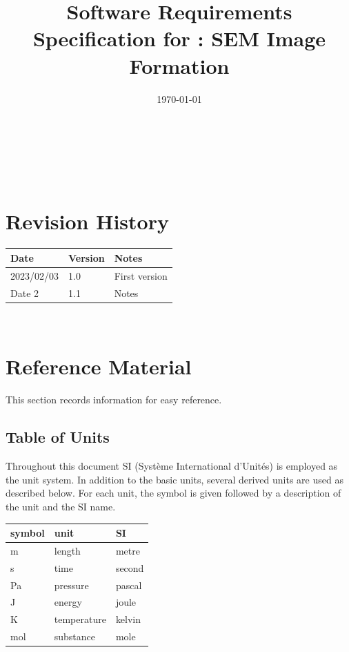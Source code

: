 \documentclass[12pt]{article}
\begin{document}

\title{Software Requirements Specification for \progname: SEM Image Formation} 
\author{\authname}
\date{\today}
	
\maketitle

~\newpage


\tableofcontents

~\newpage

\section*{Revision History}

\begin{tabularx}{\textwidth}{p{3cm}p{2cm}X}
\toprule {\bf Date} & {\bf Version} & {\bf Notes}\\
\midrule
2023/02/03 & 1.0 & First version\\
Date 2 & 1.1 & Notes\\
\bottomrule
\end{tabularx}

~\newpage

\section{Reference Material}

This section records information for easy reference.

\subsection{Table of Units}

Throughout this document SI (Syst\`{e}me International d'Unit\'{e}s) is employed
as the unit system.  In addition to the basic units, several derived units are
used as described below.  For each unit, the symbol is given followed by a
description of the unit and the SI name.
~\newline

\renewcommand{\arraystretch}{1.2}
  \noindent \begin{tabular}{l l l} 
    \toprule		
    \textbf{symbol} & \textbf{unit} & \textbf{SI}\\
    \midrule 
    \si{\metre} & length & metre\\
    \si{\second} & time & second\\
    \si{Pa} & pressure & pascal\\
    \si{J} & energy & joule\\
    \si{K} & temperature & kelvin\\
    \si{mol} & substance & mole\\
    \bottomrule
  \end{tabular}
~\newline
 
\end{document}

